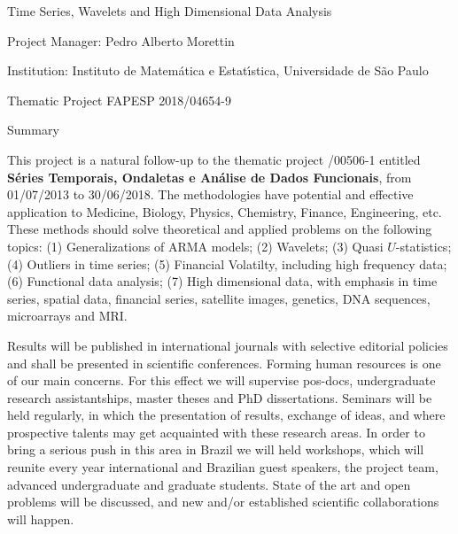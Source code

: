 \documentclass[11pt]{article}
\begin{document}
\vspace{1cm}
\thispagestyle{empty}

\begin{center}

{\huge


{\sf Time Series, Wavelets and High Dimensional Data Analysis}

}

\vspace{1cm}

Project Manager: Pedro Alberto Morettin

\vspace{1cm}

Institution: Instituto de Matem\'atica e Estat\'\i stica, Universidade de S\~ao Paulo

\vspace{.5cm}

Thematic Project FAPESP 2018/04654-9

\vspace*{1cm}

{\sc Summary}

\end{center}

This project is a natural follow-up to the thematic project  {/00506-1} entitled {\bf S\'eries Temporais, Ondaletas e An\'alise de Dados Funcionais}, from 01/07/2013 to 30/06/2018. The methodologies have potential and effective application to Medicine, Biology, Physics, Chemistry, Finance, Engineering, etc. These methods should solve theoretical and applied problems on the following topics: (1) Generalizations of ARMA models; (2) Wavelets; (3) Quasi $U$-statistics; (4) Outliers in time series; (5) Financial Volatilty, including high frequency data; (6) Functional data analysis; (7) High dimensional data, with emphasis in time series, spatial data, financial series, satellite images, genetics, DNA sequences, microarrays and MRI.

Results will be published in international journals with selective editorial policies and shall be presented in scientific conferences. Forming human resources is one of our main concerns. For this effect we will supervise pos-docs, undergraduate research assistantships, master theses and PhD dissertations. Seminars will be held regularly, in which the presentation of results, exchange of ideas, and where prospective talents may get acquainted with these research areas. In order to bring a serious push in this area in Brazil we will held workshops, which will reunite every year international and Brazilian guest speakers, the project team, advanced undergraduate and graduate students. State of the art and open problems will be discussed, and new and/or established scientific collaborations will happen. 
\end{document}
